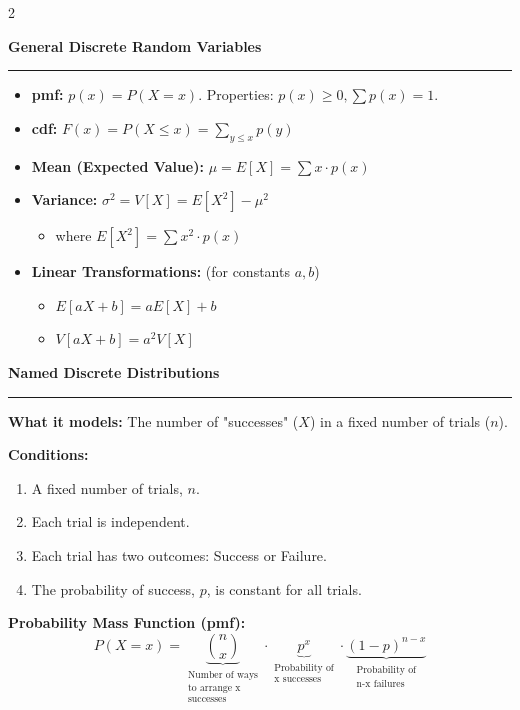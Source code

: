 \documentclass[10pt, letterpaper]{article}
\newcommand{\sectionhead}[1]{%
    \begin{center}%
    \large\bfseries#1%
    \end{center}%
    \vspace{-2mm}%
    \hrule%
    \vspace{2mm}%
}
\begin{document}
\begin{multicols}{2}
\sectionhead{General Discrete Random Variables}
\begin{itemize}[leftmargin=*, itemsep=0pt]
    \item \textbf{pmf:} \(p(x) = P(X=x)\). Properties: \(p(x)\ge 0, \sum p(x)=1\).
    \item \textbf{cdf:} \(F(x) = P(X \le x) = \sum_{y \le x} p(y)\)
    \item \textbf{Mean (Expected Value):} \(\mu = E[X] = \sum x \cdot p(x)\)
    \item \textbf{Variance:} \(\sigma^2 = V[X] = E[X^2] - \mu^2\)
        \begin{itemize}[itemsep=0pt]
            \item where \(E[X^2] = \sum x^2 \cdot p(x)\)
        \end{itemize}
    \item \textbf{Linear Transformations:} (for constants \(a,b\))
        \begin{itemize}[itemsep=0pt]
            \item \(E[aX+b] = aE[X]+b\)
            \item \(V[aX+b] = a^2V[X]\)
        \end{itemize}
\end{itemize}

\columnbreak

\sectionhead{Named Discrete Distributions}

\begin{tcolorbox}[colback=white, colframe=black, boxrule=0.5pt, title=\textbf{Binomial Distribution: \(X \sim \text{Bin}(n, p)\)}]
\textbf{What it models:} The number of "successes" (\(X\)) in a fixed number of trials (\(n\)).

\textbf{Conditions:}
\begin{enumerate}[itemsep=0pt, topsep=0pt, partopsep=0pt]
    \item A fixed number of trials, \(n\).
    \item Each trial is independent.
    \item Each trial has two outcomes: Success or Failure.
    \item The probability of success, \(p\), is constant for all trials.
\end{enumerate}

\textbf{Probability Mass Function (pmf):}
\[ P(X=x) = \underbrace{\binom{n}{x}}_{\substack{\text{Number of ways} \\ \text{to arrange x} \\ \text{successes}}} \cdot \underbrace{p^x}_{\substack{\text{Probability of} \\ \text{x successes}}} \cdot \underbrace{(1-p)^{n-x}}_{\substack{\text{Probability of} \\ \text{n-x failures}}} \]


\end{tcolorbox}
\end{multicols}
\end{document}
